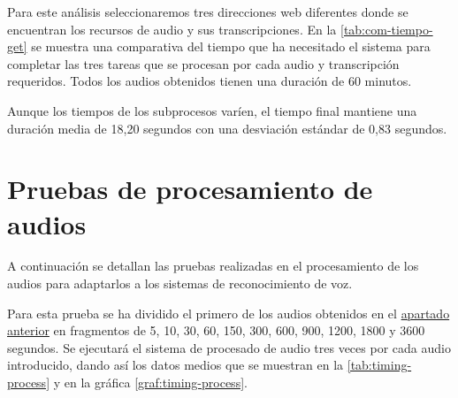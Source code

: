 \documentclass[../main.tex]{subfiles}
\begin{document}
Para este análisis seleccionaremos tres direcciones web diferentes donde se encuentran los recursos de audio y sus transcripciones. En la \autoref{tab:com-tiempo-get} se muestra una comparativa del tiempo que ha necesitado el sistema para completar las tres tareas que se procesan por cada audio y transcripción requeridos. Todos los audios obtenidos tienen una duración de 60 minutos.

\begin{table}[H]
    \centering
    \caption{Tiempos de ejecución de \textit{obtención de audios y transcripciones}.}
    \label{tab:com-tiempo-get}
\end{table}

Aunque los tiempos de los subprocesos varíen, el tiempo final mantiene una duración media de 18,20 segundos con una desviación estándar de 0,83 segundos.

\section{Pruebas de procesamiento de audios}\label{sec:val-audiprocess}
A continuación se detallan las pruebas realizadas en el procesamiento de los audios para adaptarlos a los sistemas de reconocimiento de voz.

Para esta prueba se ha dividido el primero de los audios obtenidos en el \hyperref[sec:val-get]{apartado anterior} en fragmentos de 5, 10, 30, 60, 150, 300, 600, 900, 1200, 1800 y 3600 segundos. Se ejecutará el sistema de procesado de audio tres veces por cada audio introducido, dando así los datos medios que se muestran en la \autoref{tab:timing-process} y en la gráfica \autoref{graf:timing-process}.
\end{document}
